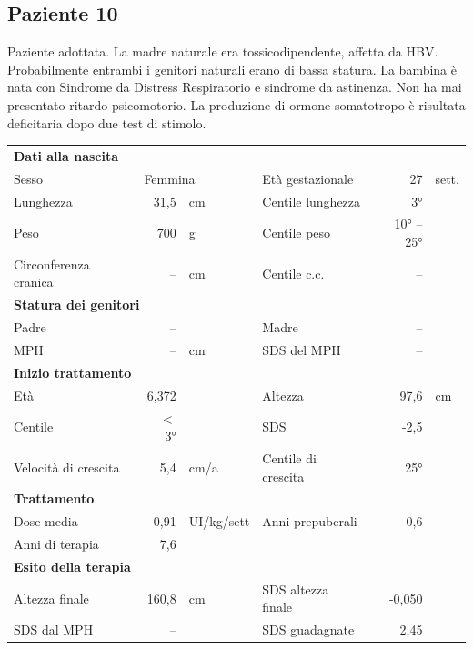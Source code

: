 \subsection*{Paziente 10}%

Paziente adottata. La madre naturale era tossicodipendente, affetta da HBV. Probabilmente entrambi i genitori naturali erano di bassa statura. La bambina è nata con Sindrome da Distress Respiratorio e sindrome da astinenza. Non ha mai presentato ritardo psicomotorio. La produzione di ormone somatotropo è risultata deficitaria dopo due test di stimolo.

\begin{table}[!h]
\begin{tabular}{lrllrl}
\toprule
\multicolumn{6}{l}{\textbf{Dati alla nascita}}\\
Sesso 		& \multicolumn{2}{l}{Femmina} 	& Età gestazionale 		& 27 		& sett.\\
Lunghezza 	& 31,5 		& cm 				& Centile lunghezza		& 3° 		\\
Peso 		& 700 		& g					& Centile peso			& 10° -- 25° \\
Circonferenza cranica	& -- 		& cm 	& Centile c.c.			& -- \\
\midrule
\multicolumn{6}{l}{\textbf{Statura dei genitori}}\\
Padre 		& -- &  	& Madre 				& -- &  \\
MPH 		& -- & cm 	& SDS del MPH 			& --\\
\midrule
\multicolumn{6}{l}{\textbf{Inizio trattamento}} \\
Età	& 6,372 & 		& Altezza 				& 97,6 & cm  \\
Centile & $<$ 3° 	 &		& SDS		& -2,5 \\
Velocità di crescita & 5,4 & cm/a	& Centile di crescita & 25°\\
\midrule
\multicolumn{6}{l}{\textbf{Trattamento}} \\
Dose media		& 0,91 & UI/kg/sett & Anni prepuberali & 0,6\\
Anni di terapia & 7,6\\
\midrule
\multicolumn{6}{l}{\textbf{Esito della terapia}} \\
Altezza finale			& 160,8 & cm 	& SDS altezza finale		& -0,050\\
SDS dal MPH				& -- &		& SDS guadagnate 			& 2,45\\
\bottomrule
\end{tabular}
\end{table}
\clearpage


